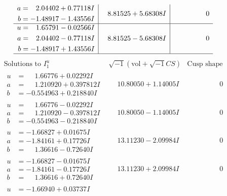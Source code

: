 \documentclass[1p]{elsarticle_modified}
\theoremstyle{definition}
\newcommand{\I}{\sqrt{-1}}
\begin{document}
$$\begin{array}{c|c|c}
\begin{aligned}
a &= \phantom{-}2.04402 + 0.77118 I \\
b &= -1.48917 - 1.43556 I\end{aligned}
 & \phantom{-}8.81525 + 5.68308 I & \phantom{-0.000000 } 0 \\ \hline\begin{aligned}
u &= \phantom{-}1.65791 - 0.02566 I \\
a &= \phantom{-}2.04402 - 0.77118 I \\
b &= -1.48917 + 1.43556 I\end{aligned}
 & \phantom{-}8.81525 - 5.68308 I & \phantom{-0.000000 } 0\\
 \hline 
 \end{array}$$\newpage$$\begin{array}{c|c|c}  
\text{Solutions to }I^u_{1}& \I (\text{vol} + \sqrt{-1}CS) & \text{Cusp shape}\\
 \hline 
\begin{aligned}
u &= \phantom{-}1.66776 + 0.02292 I \\
a &= \phantom{-}1.210920 + 0.397812 I \\
b &= -0.554963 + 0.218840 I\end{aligned}
 & \phantom{-}10.80050 + 1.14005 I & \phantom{-0.000000 } 0 \\ \hline\begin{aligned}
u &= \phantom{-}1.66776 - 0.02292 I \\
a &= \phantom{-}1.210920 - 0.397812 I \\
b &= -0.554963 - 0.218840 I\end{aligned}
 & \phantom{-}10.80050 - 1.14005 I & \phantom{-0.000000 } 0 \\ \hline\begin{aligned}
u &= -1.66827 + 0.01675 I \\
a &= -1.84161 + 0.17726 I \\
b &= \phantom{-}1.36616 - 0.72640 I\end{aligned}
 & \phantom{-}13.11230 - 2.09984 I & \phantom{-0.000000 } 0 \\ \hline\begin{aligned}
u &= -1.66827 - 0.01675 I \\
a &= -1.84161 - 0.17726 I \\
b &= \phantom{-}1.36616 + 0.72640 I\end{aligned}
 & \phantom{-}13.11230 + 2.09984 I & \phantom{-0.000000 } 0 \\ \hline\begin{aligned}
u &= -1.66940 + 0.03737 I \\

\end{aligned}
\end{array}$$
\end{document}
